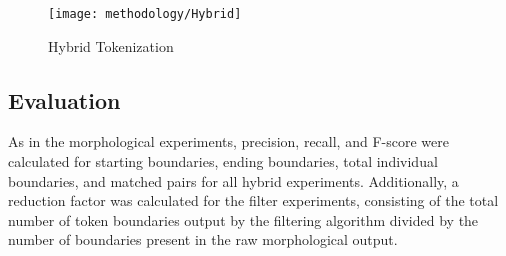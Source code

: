 \begin{figure}[ht!]
	\texttt{[image: methodology/Hybrid]}
	\caption{Hybrid Tokenization}
	\label{hybriddiagram}
\end{figure}

\subsection{Evaluation}
As in the morphological experiments, precision, recall, and F-score were calculated for starting boundaries, ending boundaries, total individual boundaries, and matched pairs for all hybrid experiments. Additionally, a reduction factor was calculated for the filter experiments, consisting of the total number of token boundaries output by the filtering algorithm divided by the number of boundaries present in the raw morphological output.